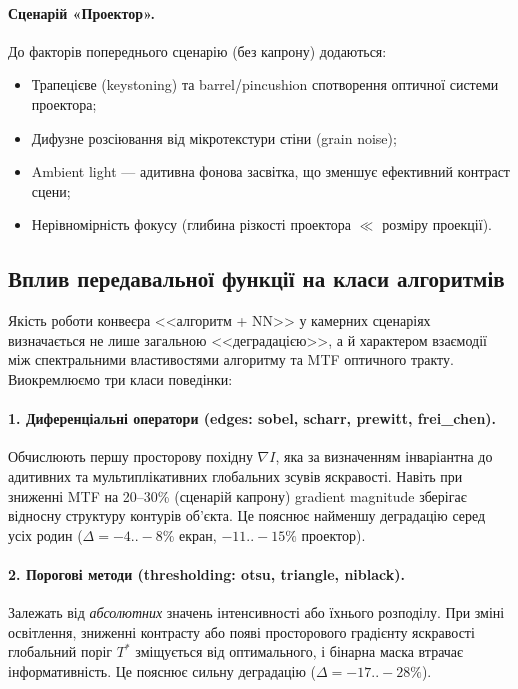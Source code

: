 \documentclass[a4paper,12pt]{article}
\begin{document}
\paragraph{Сценарій «Проектор».} До факторів попереднього сценарію (без капрону) додаються:
\begin{itemize}
	\item Трапецієве (keystoning) та barrel/pincushion спотворення оптичної системи проектора;
	\item Дифузне розсіювання від мікротекстури стіни (grain noise);
	\item Ambient light --- адитивна фонова засвітка, що зменшує ефективний контраст сцени;
	\item Нерівномірність фокусу (глибина різкості проектора $\ll$ розміру проекції).
\end{itemize}

\subsection{Вплив передавальної функції на класи алгоритмів}

Якість роботи конвеєра <<алгоритм + NN>> у камерних сценаріях визначається не лише загальною <<деградацією>>, а й характером взаємодії між спектральними властивостями алгоритму та MTF оптичного тракту. Виокремлюємо три класи поведінки:

\paragraph{1. Диференціальні оператори (edges: sobel, scharr, prewitt, frei\_chen).}
Обчислюють першу просторову похідну $\nabla I$, яка за визначенням інваріантна до адитивних та мультиплікативних глобальних зсувів яскравості. Навіть при зниженні MTF на 20--30\% (сценарій капрону) gradient magnitude зберігає відносну структуру контурів об'єкта. Це пояснює найменшу деградацію серед усіх родин ($\Delta=-4{..}-8\%$ екран, $-11{..}-15\%$ проектор).

\paragraph{2. Порогові методи (thresholding: otsu, triangle, niblack).}
Залежать від \emph{абсолютних} значень інтенсивності або їхнього розподілу. При зміні освітлення, зниженні контрасту або появі просторового градієнту яскравості глобальний поріг $T^*$ зміщується від оптимального, і бінарна маска втрачає інформативність. Це пояснює сильну деградацію ($\Delta=-17{..}-28\%$).
\end{document}
